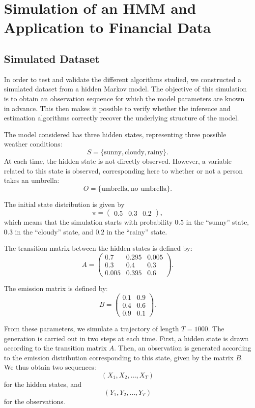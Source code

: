 \documentclass[11pt]{article}
\begin{document}
\newpage


\section{Simulation of an HMM and Application to Financial Data}

\subsection{Simulated Dataset}

In order to test and validate the different algorithms studied, we constructed a simulated dataset from a hidden Markov model. The objective of this simulation is to obtain an observation sequence for which the model parameters are known in advance. This then makes it possible to verify whether the inference and estimation algorithms correctly recover the underlying structure of the model.

The model considered has three hidden states, representing three possible weather conditions:
\[
S = \{\text{sunny}, \text{cloudy}, \text{rainy}\}.
\]
At each time, the hidden state is not directly observed. However, a variable related to this state is observed, corresponding here to whether or not a person takes an umbrella:
\[
O = \{\text{umbrella}, \text{no umbrella}\}.
\]

The initial state distribution is given by
\[
\pi =
\begin{pmatrix}
0.5 & 0.3 & 0.2
\end{pmatrix},
\]
which means that the simulation starts with probability $0.5$ in the ``sunny'' state, $0.3$ in the ``cloudy'' state, and $0.2$ in the ``rainy'' state.

The transition matrix between the hidden states is defined by: 
\[
A =
\begin{pmatrix}
0.7 & 0.295 & 0.005 \\
0.3 & 0.4 & 0.3 \\
0.005 & 0.395 & 0.6
\end{pmatrix}.
\]

The emission matrix is defined by:
\[
B =
\begin{pmatrix}
0.1 & 0.9 \\
0.4 & 0.6 \\
0.9 & 0.1
\end{pmatrix}.
\]

From these parameters, we simulate a trajectory of length $T = 1000$. The generation is carried out in two steps at each time. First, a hidden state is drawn according to the transition matrix $A$. Then, an observation is generated according to the emission distribution corresponding to this state, given by the matrix $B$. We thus obtain two sequences:
\[
(X_1, X_2, \ldots, X_T)
\]
for the hidden states, and
\[
(Y_1, Y_2, \ldots, Y_T)
\]
for the observations.
\end{document}
